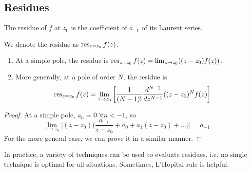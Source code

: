 \documentclass[a4paper]{article}
\begin{document}
\subsection{Residues}
\begin{defi}[Residue]
The residue of $f$ at $z_0$ is the coefficient of $a_{-1}$ of its Laurent series.
\end{defi}
\begin{notation}
We denote the residue as $\operatorname{res}_{z=z_0}f(z)$.
\end{notation}
\begin{prop}\leavevmode
\begin{enumerate}
    \item At a simple pole, the residue is $\operatorname{res}_{z=z_0}f(z)=\lim_{z\rightarrow z_0}((z-z_0)f(z))$.
    \item More generally, at a pole of order $N$, the residue is $$\operatorname{res}_{z=z_0}f(z)=\lim_{z\rightarrow z_0}\bigg[\frac{1}{(N-1)!}\frac{d^{N-1}}{dz^{N-1}}((z-z_0)^Nf(z)\bigg]$$
\end{enumerate}
\end{prop}
\begin{proof}
At a simple pole, $a_n=0$ $\forall n<-1$, so
$$\lim_{z\rightarrow z_0}\bigg[(z-z_0)\bigg(\frac{a_{-1}}{z-z_0}+a_0+a_1(z-z_0)+\dots\bigg)\bigg]=a_{-1}$$
For the more general case, we can prove it in a similar manner.
\end{proof}
In practice, a variety of techniques can be used to evaluate residues, i.e. no single technique is optimal for all situations. Sometimes, L'Hopital rule is helpful.
\end{document}
